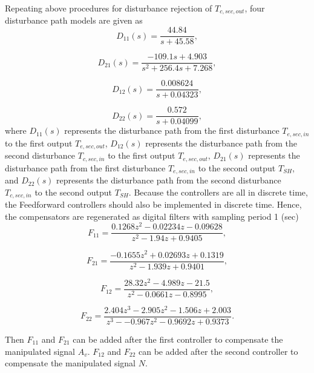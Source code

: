 \documentclass{ifacconf}
\begin{document}
Repeating above procedures for disturbance rejection of $T_{c,sec,out}$, four disturbance path models are given as
\begin{equation}
D_{11}(s)= \frac{44.84}{s+45.58},
\end{equation}

\begin{equation}
D_{21}(s)= \frac{-109.1s+4.903}{s^2+256.4s+7.268},
\end{equation}


\begin{equation}
D_{12}(s)= \frac{0.008624}{s+0.04323},
\end{equation}

\begin{equation}
D_{22}(s)= \frac{0.572}{s+0.04099},
\end{equation}
where $D_{11}(s)$ represents the disturbance path from the first disturbance $T_{e,sec,in}$ to the first output $T_{e,sec,out}$, $D_{12}(s)$ represents the disturbance path from the second disturbance $T_{c,sec,in}$ to the first output $T_{e,sec,out}$, $D_{21}(s)$ represents the disturbance path from the first disturbance $T_{e,sec,in}$ to the second output $T_{SH}$, and $D_{22}(s)$ represents the disturbance path from the second disturbance $T_{c,sec,in}$ to the second output $T_{SH}$. Because the controllers are all in discrete time, the Feedforward controllers should also be implemented in discrete time. Hence, the compensators are regenerated as digital filters with sampling period 1 (sec)
\begin{equation}
F_{11}=\frac{0.1268z^2-0.02234z-0.09628}{z^2-1.94z+0.9405},
\end{equation}

\begin{equation}
F_{21}=\frac{-0.1655z^2+0.02693z+0.1319}{z^2-1.939z+0.9401},
\end{equation}

\begin{equation}
F_{12}=\frac{28.32z^2-4.989z-21.5}{z^2-0.0661z-0.8995},
\end{equation}

\begin{equation}
F_{22}=\frac{2.404z^3-2.905z^2-1.506z+2.003}{z^3--0.967z^2-0.9692z+0.9373}.
\end{equation}

Then $F_{11}$ and $F_{21}$ can be added after the first controller to compensate the manipulated signal $A_v$. $F_{12}$ and $F_{22}$ can be added after the second controller to compensate the manipulated signal $N$.
\end{document}

